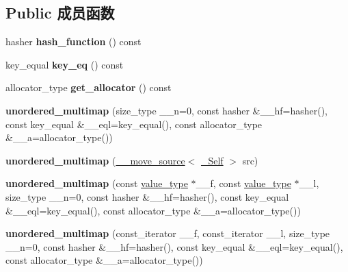 \subsection*{Public 成员函数}
\begin{DoxyCompactItemize}
\item 
\mbox{\label{classunordered__multimap_a52d7dee2993b056df57997f0f14e3d49}} 
hasher {\bfseries hash\+\_\+function} () const
\item 
\mbox{\label{classunordered__multimap_aa1e466e39c37521b28eac6246b389375}} 
key\+\_\+equal {\bfseries key\+\_\+eq} () const
\item 
\mbox{\label{classunordered__multimap_a734eda82596952bfe39095886bb2737f}} 
allocator\+\_\+type {\bfseries get\+\_\+allocator} () const
\item 
\mbox{\label{classunordered__multimap_a817d4fcb5e8a62e1725181a920e9b2fe}} 
{\bfseries unordered\+\_\+multimap} (size\+\_\+type \+\_\+\+\_\+n=0, const hasher \&\+\_\+\+\_\+hf=hasher(), const key\+\_\+equal \&\+\_\+\+\_\+eql=key\+\_\+equal(), const allocator\+\_\+type \&\+\_\+\+\_\+a=allocator\+\_\+type())
\item 
\mbox{\label{classunordered__multimap_a0707884d4b6fd6dd7e29962a04515eb5}} 
{\bfseries unordered\+\_\+multimap} (\hyperlink{class____move__source}{\+\_\+\+\_\+move\+\_\+source}$<$ \hyperlink{classunordered__multimap}{\+\_\+\+Self} $>$ src)
\item 
\mbox{\label{classunordered__multimap_a5ee7acf8ab29a65195a8a3b9fa42b4cf}} 
{\bfseries unordered\+\_\+multimap} (const \hyperlink{structpair}{value\+\_\+type} $\ast$\+\_\+\+\_\+f, const \hyperlink{structpair}{value\+\_\+type} $\ast$\+\_\+\+\_\+l, size\+\_\+type \+\_\+\+\_\+n=0, const hasher \&\+\_\+\+\_\+hf=hasher(), const key\+\_\+equal \&\+\_\+\+\_\+eql=key\+\_\+equal(), const allocator\+\_\+type \&\+\_\+\+\_\+a=allocator\+\_\+type())
\item 
\mbox{\label{classunordered__multimap_a21435a9cc8fdf7c9427bf19a4c804912}} 
{\bfseries unordered\+\_\+multimap} (const\+\_\+iterator \+\_\+\+\_\+f, const\+\_\+iterator \+\_\+\+\_\+l, size\+\_\+type \+\_\+\+\_\+n=0, const hasher \&\+\_\+\+\_\+hf=hasher(), const key\+\_\+equal \&\+\_\+\+\_\+eql=key\+\_\+equal(), const allocator\+\_\+type \&\+\_\+\+\_\+a=allocator\+\_\+type())

\end{DoxyCompactItemize}

